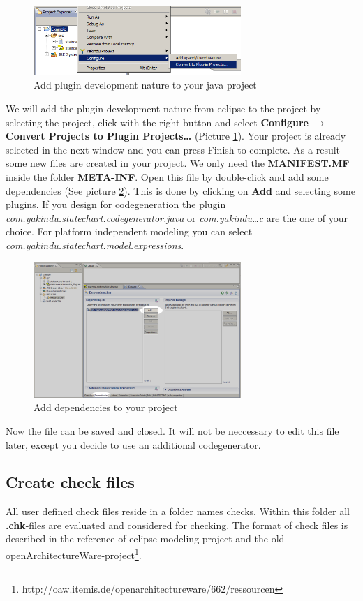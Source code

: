 \begin{figure}[ht]
\center
\includegraphics[width=0.7\textwidth]{./Pictures/switch_to_pde_project}
\caption{\label{fig:switchToPdeProject}Add plugin development nature to your java project}
\end{figure}
We will add the plugin development nature from eclipse to the project by
selecting the project, click with the right button and select \textbf{Configure}
$\rightarrow$ \textbf{Convert Projects to Plugin Projects\dots} (Picture
\ref{fig:switchToPdeProject}). Your project is already selected in the next
window and you can press Finish to complete. As a result some new files are
created in your project. We only need the \textbf{MANIFEST.MF} inside the folder
\textbf{META-INF}. Open this file by double-click and add some dependencies (See
picture \ref{fig:manifest}). This is done by clicking on \textbf{Add} and
selecting some plugins. If you design for codegeneration the plugin
\textit{com.yakindu.statechart.codegenerator.java} or
\textit{com.yakindu\dots{}c} are the one of your choice. For platform independent
modeling you can select \textit{com.yakindu.statechart.model.expressions}.
\begin{figure}[ht] \center
\includegraphics[width=0.7\textwidth]{./Pictures/manifest}
\caption{\label{fig:manifest}Add dependencies to your project}
\end{figure}

Now the file can be saved and closed. It will not be neccessary to edit this file
later, except you decide to use an additional codegenerator.

\subsection{Create check files}
All user defined check files reside in a folder names checks. Within this folder
all \textbf{.chk}-files are evaluated and considered for checking. The format of
check files is described in the reference of eclipse modeling project and the old
openArchitectureWare-project\footnote{http://oaw.itemis.de/openarchitectureware/662/ressourcen}.

